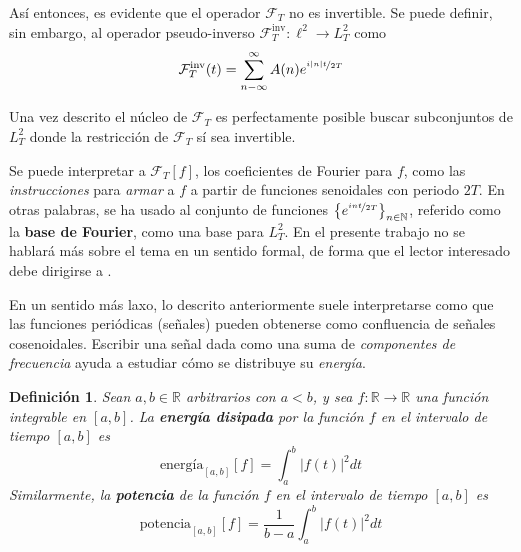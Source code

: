 \documentclass[12pt,letterpaper]{book}
\newtheorem{definicion}{Definición}[chapter]
\newcommand{\R}{\mathbb{R}}
\newcommand{\N}{\mathbb{N}}
\newcommand{\COS}[1]{\mathrm{cos}\left( #1 \right)}
\newcommand{\SEN}[1]{\mathrm{sen}\left( #1 \right)}
\newcommand{\abso}[1]{\left| #1 \right|}
\begin{document}
Así entonces, es evidente que el operador $\mathcal{F}_T$ no es invertible.
%
Se puede definir, sin embargo, al operador pseudo-inverso $\mathcal{F}_{T}^{\text{inv}} : \ell^{2} \rightarrow L^{2}_T$ como
\begin{equation}
\mathcal{F}_{T}^{\text{inv}}(t) = \sum_{n -\infty}^{\infty} A(n) e^{\nicefrac{i \abso{n} t}{2 T}}
\end{equation}

Una vez descrito el núcleo de $\mathcal{F}_{T}$ es perfectamente posible buscar subconjuntos de $L^{2}_T$ donde la restricción de $\mathcal{F}_{T}$ sí sea invertible.
%


Se puede interpretar a $\mathcal{F}_{T}[f]$, los coeficientes de Fourier para $f$, como las \textit{instrucciones} para \textit{armar} a $f$ a partir de funciones senoidales con periodo $2T$.
%
En otras palabras, se ha usado al conjunto de funciones $\left\{ e^{\nicefrac{i {n} t}{2 T}} \right\}_{n\in \N}$, referido como la \textbf{base de Fourier}, como una base para $L^{2}_T$.
%
En el presente trabajo no se hablará más sobre el tema en un sentido formal, de forma que el lector interesado debe dirigirse a \cite{estacionariedad_lindgren}.%

En un sentido más laxo, lo descrito anteriormente suele interpretarse como que las funciones periódicas (señales) pueden obtenerse como confluencia de señales cosenoidales.
%
Escribir una señal dada como una suma de \textit{componentes de frecuencia} ayuda a estudiar cómo se distribuye su \textit{energía}.

\begin{definicion}
Sean $a,b \in \R$ arbitrarios con $a<b$, y sea $f: \R \rightarrow \R$ una función integrable en $[a,b]$. La \textbf{energía disipada} por la función $f$ en el intervalo de tiempo $[a,b]$ es
\begin{equation}
\text{energía}_{[a,b]}[f] = \int_a^{b} \abso{f(t)}^{2} dt
\end{equation}
Similarmente, la \textbf{potencia} de la función $f$ en el intervalo de tiempo $[a,b]$ es
\begin{equation}
\text{potencia}_{[a,b]}[f] = \frac{1}{b-a} \int_a^{b} \abso{f(t)}^{2} dt
\end{equation}
\label{lazy5}
\end{definicion}
\end{document}
